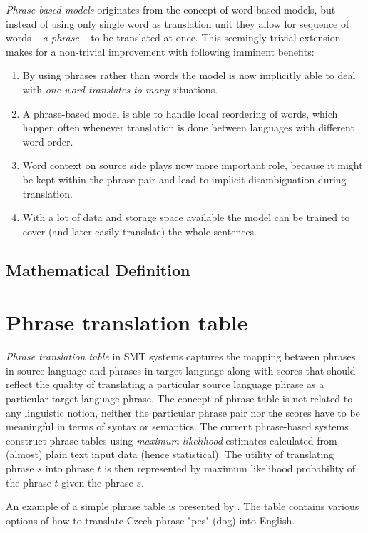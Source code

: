 \emph{Phrase-based models} originates from the concept of word-based models,
but instead of using only single word as translation unit they
allow for sequence of words -- \emph{a phrase} -- to be translated at once.
This seemingly trivial extension makes for a non-trivial improvement
with following imminent benefits:
\begin{enumerate}
  \item By using phrases rather than words the model is now implicitly able to deal with
    \emph{one-word-translates-to-many} situations.
  \item A phrase-based model is able to handle local reordering of words, which happen
    often whenever translation is done between languages with different word-order.
  \item Word context on source side plays now more important role, because it might be kept
    within the phrase pair and lead to implicit disambiguation during translation.
  \item With a lot of data and storage space available the model can be trained to cover
    (and later easily translate) the whole sentences.
\end{enumerate}


\subsection{Mathematical Definition}


\section{Phrase translation table}

\emph{Phrase translation table} in SMT systems captures the mapping
between phrases in source language and phrases in target language
along with scores that should reflect the quality of translating a particular
source language phrase as a particular target language phrase.
The concept of phrase table is not related to any linguistic notion,
neither the particular phrase pair nor the scores have to be meaningful
in terms of syntax or semantics. The current phrase-based systems construct
phrase tables using \emph{maximum likelihood} estimates calculated from (almost)
plain text input data (hence statistical). The utility of translating phrase
$s$ into phrase $t$ is then represented by maximum likelihood probability of
the phrase $t$ given the phrase $s$.

An example of a simple phrase table is presented by .
The table contains various options of how to translate Czech phrase
"pes" (dog) into English.

